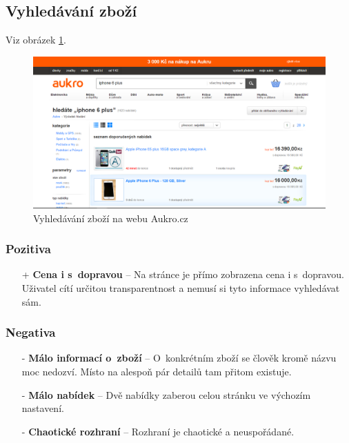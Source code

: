
\newpage
\subsection{Vyhledávání zboží}
Viz obrázek \ref{fig:aukro:search}.
\begin{figure}[h]
    \centering
    \includegraphics[width=1.0\textwidth]{media/aukro/search.png}
    \caption{Vyhledávání zboží na webu Aukro.cz}
    \label{fig:aukro:search}
\end{figure}
\subsubsection*{Pozitiva}
\begin{itemize}
    \item[+] \textbf{Cena i s~dopravou} -- Na stránce je přímo zobrazena cena i s~dopravou. Uživatel cítí určitou transparentnost a nemusí si tyto informace vyhledávat sám.
\end{itemize}
\subsubsection*{Negativa}
\begin{itemize}
    \item[-] \textbf{Málo informací o~zboží} -- O~konkrétním zboží se člověk kromě názvu moc nedozví. Místo na alespoň pár detailů tam přitom existuje.
    \item[-] \textbf{Málo nabídek} -- Dvě nabídky zaberou celou stránku ve výchozím nastavení.
    \item[-] \textbf{Chaotické rozhraní} -- Rozhraní je chaotické a neuspořádané.
\end{itemize}


